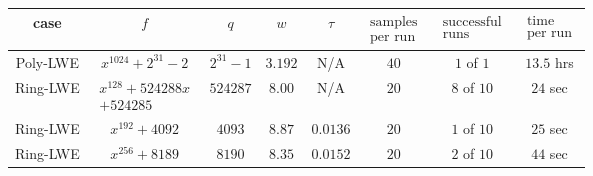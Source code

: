 \documentclass{llncs}
\newcommand{\<}{\langle}
\renewcommand{\>}{\rangle}
\begin{document}
\begin{center}
        {\renewcommand{\arraystretch}{1.5}
         \setlength{\tabcolsep}{0.5em}
  \begin{tabular}{ c | c | c | c | c | c | c | c}
          {\small case} & $f$ & $q$ & $w$ & $\tau$ & {\small $\substack{\text{samples}\\\text{per run}}$} & {\small $\substack{\text{successful}\\\text{runs}}$} & {\small $\substack{\text{time}\\\text{per run}}$} \\ \hline
    \hline
    {\small Poly-LWE} & $x^{1024}+2^{31}-2$  & $2^{31}-1$ & $3.192$ & N/A & $40$ & $1$ of $1$ & $13.5$ hrs \\
    \hline\hline
    {\small Ring-LWE} & $\substack{x^{128}+524288x \\+524285}$ &  $524287$ & $8.00$ & N/A & $20$ & $8$ of $10$ & $24$ sec \\
    \hline\hline
    {\small Ring-LWE} & $x^{192}+4092$ &  $4093$ & $8.87$ & $0.0136$ & $20$ & $1$ of $10$ & $25$ sec \\
    \hline
    {\small Ring-LWE} & $x^{256}+8189$ &  $8190$ & $8.35$ & $0.0152$ & $20$ & $2$ of $10$ & $44$ sec \\
    \hline
  \end{tabular}}
\end{center}
\end{document}
